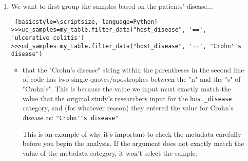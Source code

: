 \begin{enumerate}
            
                \begin{itemize}
                \item With the \verb|my_table| object created, you can remind yourself what the metadata categories are by using the following command:
                \end{itemize}
                \begin{lstlisting} [basicstyle=\footnotesize, language=Python]
>>> my_table.column_names
['Assay_Type', 'AvgSpotLen', 'BioSample', 'BioSampleModel', 
 'Experiment', 'Instrument', 'LibrarySelection', 'LibrarySource', 
 'Library_Name', 'LoadDate', 'MBases', 'MBytes', 'Organism', 
 'ReleaseDate', 'Run', 'SRA_Sample', 'Sample_Name', 
 'collection_date', 'env_biome', 'env_feature', 'env_material', 
 'host_age', 'host_disease', 'host_sex', 'host_subject_id', 
 'lat_lon', 'BioProject', 'Consent', 'DATASTORE_filetype', 
 'DATASTORE_provider', 'InsertSize', 'LibraryLayout', 'Platform', 
 'SRA_Study', 'geo_loc_name', 'host']
                \end{lstlisting}
                
                
            \item We want to first group the samples based on the patients' disease...
            \begin{lstlisting} [basicstyle=\scriptsize, language=Python]
>>>uc_samples=my_table.filter_data("host_disease", '==', 'ulcerative colitis')
>>>cd_samples=my_table.filter_data("host_disease", '==', "Crohn''s disease")
            \end{lstlisting}
                \begin{itemize}
                \item {} that the "Crohn's disease" string within the parentheses in the second line of code has two single-quotes/apostrophes between the "n" and the "s" of "Crohn's". This is because the value we input must exactly match the value that the original study's researchers input for the \verb|host_disease| category, and (for whatever reason) they entered the value for Crohn's disease as:   \verb|"Crohn''s disease"|
                
                This is an example of why it's important to check the metadata carefully before you begin the analysis. If the argument does not exactly match the value of the metadata category, it won't select the sample. 
                \end{itemize}
            

\end{enumerate}
